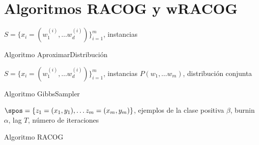 \section{Algoritmos RACOG y wRACOG}

\begin{algorithm}[H]
\begin{algorithmic}[1]
  \REQUIRE $S = \{x_i=(w_1^{(i)}, \ldots w_d^{(i)})\}_{i=1}^m$, instancias
  \ENDFOR
\end{algorithmic}
\caption{Algoritmo AproximarDistribución}
\label{multiplicacion}
\end{algorithm}

\begin{algorithm}[H]
\begin{algorithmic}[1]
  \REQUIRE $S = \{x_i=(w_1^{(i)}, \ldots w_d^{(i)})\}_{i=1}^m$, instancias
  \REQUIRE $P(w_1, \ldots w_m)$, distribución conjunta
    \ENDFOR
  \ENDFOR
\end{algorithmic}
\caption{Algoritmo GibbsSampler}
\label{multiplicacion}
\end{algorithm}


\begin{algorithm}[H]
\begin{algorithmic}[1]
  \REQUIRE $\spos = \{z_1=(x_1, y_1), \ldots z_m=(x_m, y_m)\}$, ejemplos de la clase positiva
  \REQUIRE $\beta$, burnin
  \REQUIRE $\alpha$, lag
  \REQUIRE $T$, número de iteraciones
  \NEWLINE
    \NEWLINE
    \ENDIF
  \ENDFOR
  \NEWLINE
\end{algorithmic}
\caption{Algoritmo RACOG}
\label{multiplicacion}
\end{algorithm}